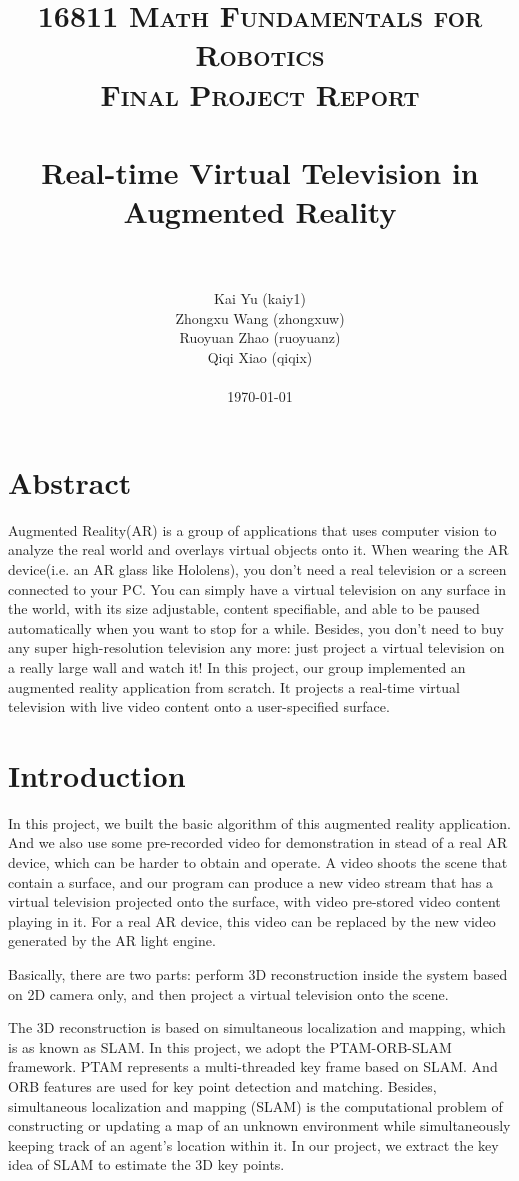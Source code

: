 \documentclass[paper=a4, fontsize=14pt]{scrartcl}
\title{
                \usefont{OT1}{bch}{b}{n}
                \normalfont \normalsize \textsc{16811 Math Fundamentals for Robotics\\
        Final Project Report} \\ [25pt]
                \horrule{0.5pt} \\[0.4cm]
                \huge Real-time Virtual Television in Augmented Reality \\
                \horrule{2pt} \\[0.5cm]
}
\author{
                \normalfont
        Kai Yu (kaiy1)\\
        Zhongxu Wang (zhongxuw)\\
        Ruoyuan Zhao (ruoyuanz)\\
        Qiqi Xiao (qiqix)\\[-3pt]               
        \\
        \normalsize
        \today
}
\date{}
\numberwithin{equation}{section}                %
\numberwithin{figure}{section}                  %
\numberwithin{table}{section}                           %
\begin{document}
\maketitle
\section{Abstract}

Augmented Reality(AR) is a group of applications that uses computer vision to analyze the real world and overlays virtual objects onto it. 
When wearing the AR device(i.e. an AR glass like Hololens), you don't need a real television or a screen connected to your PC. 
You can simply have a virtual television on any surface in the world, with its size adjustable, content specifiable, and able to be paused automatically when you want to stop for a while.
Besides, you don't need to buy any super high-resolution television any more: just project a virtual television on a really large wall and watch it!
In this project, our group implemented an augmented reality application from scratch. 
It projects a real-time virtual television with live video content onto a user-specified surface. 

\newpage
\section{Introduction}\label{intro}
In this project, we built the basic algorithm of this augmented reality application.
And we also use some pre-recorded video for demonstration in stead of a real AR device, which can be harder to obtain and operate. 
A video shoots the scene that contain a surface, and our program can produce a new video stream that has a virtual television projected onto the surface, with video pre-stored video content playing in it.
For a real AR device, this video can be replaced by the new video generated by the AR light engine.

Basically, there are two parts: perform 3D reconstruction inside the system based on 2D camera only, and then project a virtual television onto the scene. 

The 3D reconstruction is based on simultaneous localization and mapping, which is as known as SLAM. In this project, we adopt the PTAM-ORB-SLAM framework. 
PTAM represents a multi-threaded key frame based on SLAM.
And ORB features are used for key point detection and matching. Besides, simultaneous localization and mapping (SLAM) is the computational problem of constructing or updating a map of an unknown environment while simultaneously keeping track of an agent's location within it. 
In our project, we extract the key idea of SLAM to estimate the 3D key points.
\end{document}
